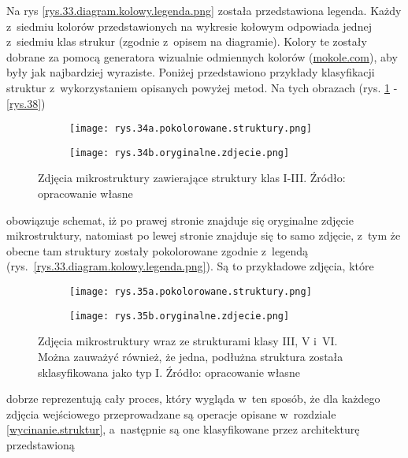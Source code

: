 Na rys \ref{rys.33.diagram.kolowy.legenda.png} została przedstawiona legenda. Każdy z~siedmiu kolorów przedstawionych na wykresie kołowym odpowiada jednej z~siedmiu klas strukur (zgodnie z~opisem na diagramie). Kolory te zostały dobrane za pomocą generatora wizualnie odmiennych kolorów (\href{https://mokole.com/palette.html}{mokole.com}), aby były jak najbardziej wyraziste. Poniżej przedstawiono przykłady klasyfikacji struktur z~wykorzystaniem opisanych powyżej metod. Na tych obrazach (rys. \ref{rys.34} - \ref{rys.38}) 
\begin{figure}[h]
	\centering
	\begin{subfigure}{0.4\textwidth}
	    \centering
	    \texttt{[image: rys.34a.pokolorowane.struktury.png]}
	\end{subfigure}
	\begin{subfigure}{0.4\textwidth}
	    \centering
	    \texttt{[image: rys.34b.oryginalne.zdjecie.png]}
	\end{subfigure}
	\caption{\label{rys.34}Zdjęcia mikrostruktury zawierające struktury klas I-III. Źródło: opracowanie własne}
\end{figure}
obowiązuje schemat, iż po prawej stronie znajduje się oryginalne zdjęcie mikrostruktury, natomiast po lewej stronie znajduje się to samo zdjęcie, z~tym że obecne tam struktury zostały pokolorowane zgodnie z~legendą (rys.~\ref{rys.33.diagram.kolowy.legenda.png}). Są to przykładowe zdjęcia, które 
\begin{figure}[h]
	\centering
	\begin{subfigure}{0.4\textwidth}
	    \centering
	    \texttt{[image: rys.35a.pokolorowane.struktury.png]}
	\end{subfigure}
	\begin{subfigure}{0.4\textwidth}
	    \centering
	    \texttt{[image: rys.35b.oryginalne.zdjecie.png]}
	\end{subfigure}
	\caption{\label{rys.35}Zdjęcia mikrostruktury wraz ze strukturami klasy III, V i~VI. Można zauważyć również, że jedna, podłużna struktura została sklasyfikowana jako typ I. Źródło: opracowanie własne}
\end{figure}
dobrze reprezentują cały proces, który wygląda w~ten sposób, że dla każdego zdjęcia wejściowego przeprowadzane są operacje opisane w~rozdziale \ref{wycinanie.struktur}, a~następnie są one klasyfikowane przez architekturę przedstawioną
